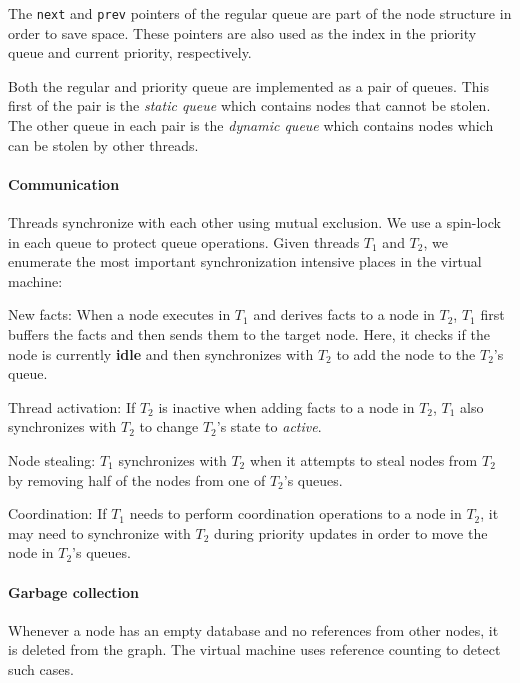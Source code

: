 The \texttt{next} and \texttt{prev} pointers of the regular queue are
part of the node structure in order to save space. These pointers are
also used as the index in the priority queue and current priority,
respectively.

Both the regular and priority queue are implemented as a pair of
queues.  This first of the pair is the \emph{static queue} which
contains nodes that cannot be stolen.  The other queue in each pair is
the \emph{dynamic queue} which contains nodes which can be stolen by
other threads.

\paragraph{Communication}

Threads synchronize with each other using mutual exclusion. We use a spin-lock in
each queue to protect queue operations.
Given threads $T_1$ and $T_2$, we enumerate the most important
synchronization intensive places in the virtual machine:

\begin{tightdescription}
   \item[New facts:] When a node executes in $T_1$ and derives facts
   to a node in $T_2$, $T_1$ first buffers the facts 
   and then sends them to the target node. Here, it checks if the
   node is currently \textbf{idle} and then synchronizes with $T_2$ to add the
   node to the $T_2$'s queue.
   \item[Thread activation:] If $T_2$ is inactive when adding facts to a node in
   $T_2$, $T_1$ also synchronizes with $T_2$ to change $T_2$'s state to \emph{active}.
   \item[Node stealing:] $T_1$ synchronizes with $T_2$ when it attempts to steal
   nodes from $T_2$ by removing half of the nodes from one of $T_2$'s queues.
   \item[Coordination:] If $T_1$ needs to perform coordination operations
   to a node in $T_2$, it may need to synchronize with $T_2$ during priority
   updates in order to move the node in $T_2$'s queues.
\end{tightdescription}

\paragraph{Garbage collection}

Whenever a node has an empty database and no references from other nodes, it is
deleted from the graph. The virtual machine uses reference counting to detect
such cases.

